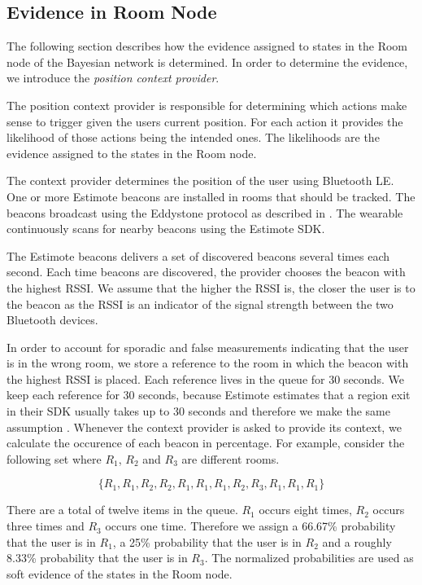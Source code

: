 \subsection{Evidence in Room Node}
\label{sec:design:bayesian-network:room-node-evidence}

The following section describes how the evidence assigned to states in the Room node of the Bayesian network is determined. In order to determine the evidence, we introduce the \emph{position context provider}.

The position context provider is responsible for determining which actions make sense to trigger given the users current position. For each action it provides the likelihood of those actions being the intended ones. The likelihoods are the evidence assigned to the states in the Room node.

The context provider determines the position of the user using Bluetooth LE. One or more Estimote beacons are installed in rooms that should be tracked. The beacons broadcast using the Eddystone protocol as described in . The wearable continuously scans for nearby beacons using the Estimote SDK.

The Estimote beacons delivers a set of discovered beacons several times each second. Each time beacons are discovered, the provider chooses the beacon with the highest RSSI. We assume that the higher the RSSI is, the closer the user is to the beacon as the RSSI is an indicator of the signal strength between the two Bluetooth devices.

In order to account for sporadic and false measurements indicating that the user is in the wrong room, we store a reference to the room in which the beacon with the highest RSSI is placed. Each reference lives in the queue for 30 seconds. We keep each reference for 30 seconds, because Estimote estimates that a region exit in their SDK usually takes up to 30 seconds and therefore we make the same assumption \cite{estimote:beacon-monitoring}. Whenever the context provider is asked to provide its context, we calculate the occurence of each beacon in percentage. For example, consider the following set where $R_1$, $R_2$ and $R_3$ are different rooms.

\begin{equation*}
  \{ R_1, R_1, R_2, R_2, R_1, R_1, R_1, R_2, R_3, R_1, R_1, R_1 \}
\end{equation*}

There are a total of twelve items in the queue. $R_1$ occurs eight times, $R_2$ occurs three times and $R_3$ occurs one time. Therefore we assign a 66.67\% probability that the user is in $R_1$, a 25\% probability that the user is in $R_2$ and a roughly 8.33\% probability that the user is in $R_3$. The normalized probabilities are used as soft evidence of the states in the Room node.

